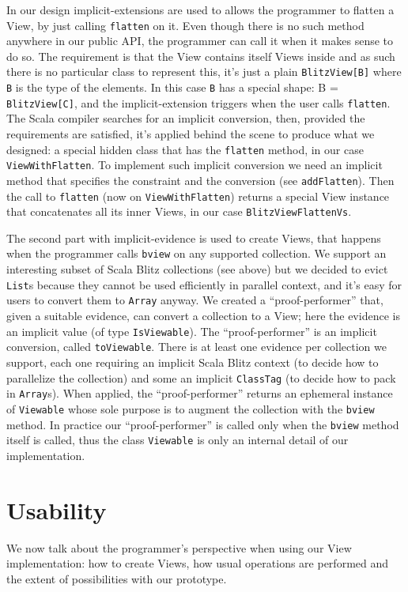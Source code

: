 \documentclass[a4paper,12pt,twocolumn]{article}
\begin{document}
In our design implicit-extensions are used to allows the programmer to flatten a View, by just calling \verb|flatten| on it.
Even though there is no such method anywhere in our public API, the programmer can call it when it makes sense to do so.
The requirement is that the View contains itself Views inside and as such there is no particular class to represent this, it's just a plain \verb|BlitzView[B]| where \verb|B| is the type of the elements.
In this case \verb|B| has a special shape: B = \verb|BlitzView[C]|, and the implicit-extension triggers when the user calls \verb|flatten|.
The Scala compiler searches for an implicit conversion, then, provided the requirements are satisfied, it's applied behind the scene to produce what we designed: a special hidden class that has the \verb|flatten| method, in our case \verb|ViewWithFlatten|.
To implement such implicit conversion we need an implicit method that specifies the constraint and the conversion (see \verb|addFlatten|).
Then the call to \verb|flatten| (now on \verb|ViewWithFlatten|) returns a special View instance that concatenates all its inner Views, in our case \verb|BlitzViewFlattenVs|.

The second part with implicit-evidence is used to create Views, that happens when the programmer calls \verb|bview| on any supported collection.
We support an interesting subset of Scala Blitz collections (see above) but we decided to evict \verb|List|s because they cannot be used efficiently in parallel context, and it's easy for users to convert them to \verb|Array| anyway.
We created a ``proof-performer'' that, given a suitable evidence, can convert a collection to a View; here the evidence is an implicit value (of type \verb|IsViewable|).
The ``proof-performer'' is an implicit conversion, called \verb|toViewable|.
There is at least one evidence per collection we support, each one requiring an implicit Scala Blitz context (to decide how to parallelize the collection) and some an implicit \verb|ClassTag| (to decide how to pack in \verb|Array|s).
When applied, the ``proof-performer'' returns an ephemeral instance of \verb|Viewable| whose sole purpose is to augment the collection with the \verb|bview| method.
In practice our ``proof-performer'' is called only when the \verb|bview| method itself is called, thus the class \verb|Viewable| is only an internal detail of our implementation.

\section{Usability}
We now talk about the programmer's perspective when using our View implementation: how to create Views, how usual operations are performed and the extent of possibilities with our prototype.
\end{document}
